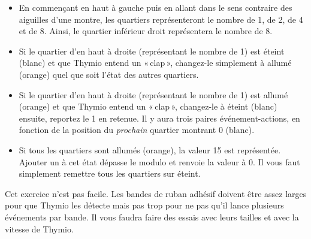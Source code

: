 \begin{itemize}
\item En commençant en haut à gauche puis en allant dans le sens contraire des aiguilles d'une montre,
les quartiers représenteront le nombre de 1, de 2, de 4
et de 8.
Ainsi, le quartier inférieur droit représentera le nombre de 8.
\item Si le quartier d'en haut à droite (représentant le nombre de 1) est éteint (blanc) et que Thymio entend un «\,clap\,», changez-le simplement à allumé (orange) quel que soit l'état des autres quartiers.
\item Si le quartier d'en haut à droite (représentant le nombre de 1) est allumé (orange) et que Thymio entend un «\,clap\,», changez-le à éteint (blanc) ensuite, reportez le 1 en retenue.
Il y aura trois paires événement-actions, en fonction de la position du \emph{prochain} quartier montrant 0 (blanc).
\item Si tous les quartiers sont allumés (orange), la valeur 15 est représentée. Ajouter un à cet état dépasse le modulo et renvoie la valeur à 0. Il vous faut simplement remettre tous les quartiers sur éteint.
\end{itemize}

\bigskip


\bigskip


\bigskip

Cet exercice n'est pas facile.
Les bandes de ruban adhésif doivent être assez larges
pour que Thymio les détecte mais pas trop
pour ne pas qu'il lance plusieurs événements par bande.
Il vous faudra faire des essais avec leurs tailles et avec la vitesse de Thymio.

